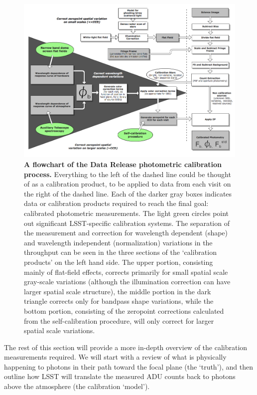\documentclass[12pt,preprint]{aastex}
\begin{document}
\begin{figure}[htbp]
\includegraphics[width=6.5in]{calib_overview}
\caption{ {\small {\bf A flowchart of the Data Release photometric
      calibration process.} Everything to the left of the dashed line
    could be thought of as a calibration product, to be applied to
    data from each visit on the right of the dashed line. Each of the
    darker gray boxes indicates data or calibration products required
    to reach the final goal: calibrated photometric measurements. The
    light green circles point out significant LSST-specific calibration
    systems. The separation of the measurement and correction for 
    wavelength dependent (shape) and wavelength independent
    (normalization) variations in the throughput can be seen in the
    three sections of the `calibration products' on the left hand
    side. The upper portion, consisting mainly of flat-field effects,
    corrects primarily for small spatial scale gray-scale variations (although
    the illumination correction can have larger spatial scale
    structure), the middle portion in the dark triangle corrects only
    for bandpass shape variations, while the bottom portion,
    consisting of the zeropoint corrections calculated from the
    self-calibration procedure, will only correct for larger spatial
    scale variations. }
\label{fig:overview_flowchart} }
\end{figure}

The rest of this section will provide a more in-depth overview of the
calibration measurements required. We will start with a review of what
is physically happening to photons in their path toward the focal
plane (the `truth'), and then outline how LSST will translate the
measured ADU counts back to photons above the atmosphere (the
calibration `model').
\end{document}
